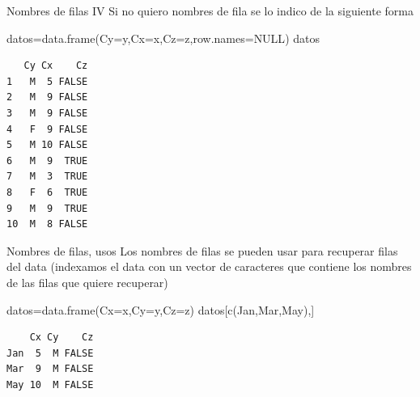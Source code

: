 \documentclass[
  ignorenonframetext,
  aspectratio=169,
  spanish,
]{beamer}
\newenvironment{Shaded}{\begin{snugshade}}{\end{snugshade}}
\newcommand{\AttributeTok}[1]{\textcolor[rgb]{0.40,0.45,0.13}{#1}}
\newcommand{\ConstantTok}[1]{\textcolor[rgb]{0.56,0.35,0.01}{#1}}
\newcommand{\FunctionTok}[1]{\textcolor[rgb]{0.28,0.35,0.67}{#1}}
\newcommand{\NormalTok}[1]{\textcolor[rgb]{0.00,0.23,0.31}{#1}}
\newcommand{\OtherTok}[1]{\textcolor[rgb]{0.00,0.23,0.31}{#1}}
\newcommand{\StringTok}[1]{\textcolor[rgb]{0.13,0.47,0.30}{#1}}
\begin{document}
\begin{frame}[fragile]{Nombres de filas IV}
\label{nombres-de-filas-iv}
Si no quiero nombres de fila se lo indico de la siguiente forma

\begin{Shaded}
\begin{Highlighting}[]
\NormalTok{datos}\OtherTok{=}\FunctionTok{data.frame}\NormalTok{(}\AttributeTok{Cy=}\NormalTok{y,}\AttributeTok{Cx=}\NormalTok{x,}\AttributeTok{Cz=}\NormalTok{z,}\AttributeTok{row.names=}\ConstantTok{NULL}\NormalTok{) }
\NormalTok{datos}
\end{Highlighting}
\end{Shaded}

\begin{verbatim}
   Cy Cx    Cz
1   M  5 FALSE
2   M  9 FALSE
3   M  9 FALSE
4   F  9 FALSE
5   M 10 FALSE
6   M  9  TRUE
7   M  3  TRUE
8   F  6  TRUE
9   M  9  TRUE
10  M  8 FALSE
\end{verbatim}
\end{frame}

\begin{frame}[fragile]{Nombres de filas, usos}
\label{nombres-de-filas-usos}
Los nombres de filas se pueden usar para recuperar filas del data
(indexamos el data con un vector de caracteres que contiene los nombres
de las filas que quiere recuperar)

\begin{Shaded}
\begin{Highlighting}[]
\NormalTok{datos}\OtherTok{=}\FunctionTok{data.frame}\NormalTok{(}\AttributeTok{Cx=}\NormalTok{x,}\AttributeTok{Cy=}\NormalTok{y,}\AttributeTok{Cz=}\NormalTok{z)  }
\NormalTok{datos[}\FunctionTok{c}\NormalTok{(}\StringTok{\textquotesingle{}Jan\textquotesingle{}}\NormalTok{,}\StringTok{\textquotesingle{}Mar\textquotesingle{}}\NormalTok{,}\StringTok{\textquotesingle{}May\textquotesingle{}}\NormalTok{),] }
\end{Highlighting}
\end{Shaded}

\begin{verbatim}
    Cx Cy    Cz
Jan  5  M FALSE
Mar  9  M FALSE
May 10  M FALSE
\end{verbatim}
\end{frame}
\end{document}

